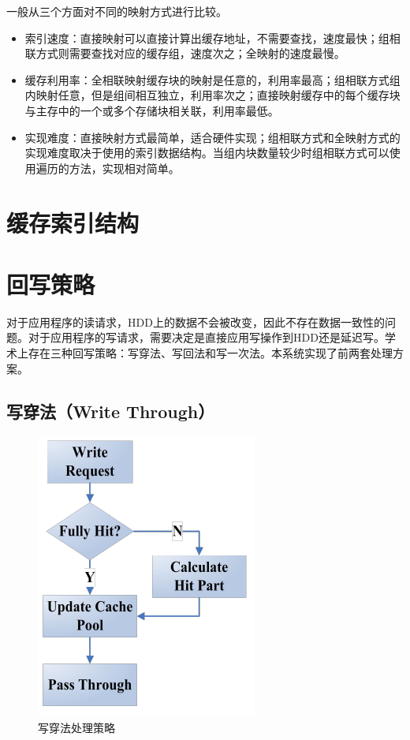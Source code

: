 一般从三个方面对不同的映射方式进行比较。
\begin{itemize}
\item 索引速度：直接映射可以直接计算出缓存地址，不需要查找，速度最快；组相联方式则需要查找对应的缓存组，速度次之；全映射的速度最慢。
\item
缓存利用率：全相联映射缓存块的映射是任意的，利用率最高；组相联方式组内映射任意，但是组间相互独立，利用率次之；直接映射缓存中的每个缓存块与主存中的一个或多个存储块相关联，利用率最低。
\item
实现难度：直接映射方式最简单，适合硬件实现；组相联方式和全映射方式的实现难度取决于使用的索引数据结构。当组内块数量较少时组相联方式可以使用遍历的方法，实现相对简单。
\end{itemize}

\section{缓存索引结构}
\label{sec:cache_indexing}

\section{回写策略}
\label{sec:wb_strategy}

对于应用程序的读请求，HDD上的数据不会被改变，因此不存在数据一致性的问题。对于应用程序的写请求，需要决定是直接应用写操作到HDD还是延迟写。学术上存在三种回写策略：写穿法、写回法和写一次法。本系统实现了前两套处理方案。

\subsection{写穿法（Write Through）}
\begin{figure}
\centering
\includegraphics[width=0.4\linewidth]{./graph/write-through}
\caption{写穿法处理策略}
\label{fig:write-through}
\end{figure}

